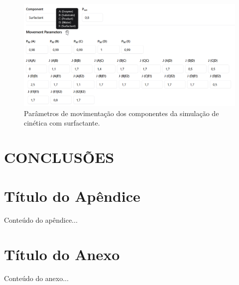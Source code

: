 \documentclass[12pt,oneside]{report}
\begin{document}
\begin{figure}[H]
    \centering
    \includegraphics[width=1\textwidth]{movement_MM_surfactant.png}
    \caption{\small Parâmetros de movimentação dos componentes da simulação de cinética com surfactante.}
    \label{fig:michaelis_menten_movement_surfactante}
\end{figure}

\chapter{CONCLUSÕES}

\printbibliography[title={REFERÊNCIAS},heading=bibnumbered]

\appendix

\chapter{Título do Apêndice}
Conteúdo do apêndice...

\chapter{Título do Anexo}
Conteúdo do anexo...
\end{document}
